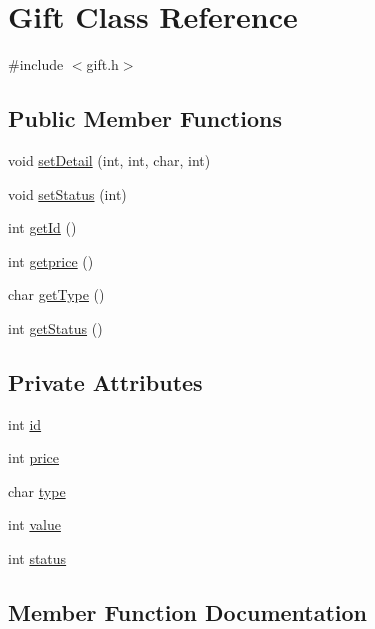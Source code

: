 \hypertarget{classGift}{}\section{Gift Class Reference}
\label{classGift}


{\ttfamily \#include $<$gift.\+h$>$}

\subsection*{Public Member Functions}
\begin{DoxyCompactItemize}
\item 
void \hyperlink{classGift_abc74fbed8b31b5bb7745b3e0c934da9e}{set\+Detail} (int, int, char, int)
\item 
void \hyperlink{classGift_a8c8a8be33c3abe17bbe4b8da9ac084d6}{set\+Status} (int)
\item 
int \hyperlink{classGift_a5b276dda8fab4a4e2618ba82fc8cd787}{get\+Id} ()
\item 
int \hyperlink{classGift_aa36f2b437e93ede1d2569e489b493441}{getprice} ()
\item 
char \hyperlink{classGift_aa7143116bd10c7e5635252d081b42ef9}{get\+Type} ()
\item 
int \hyperlink{classGift_ad0630b128cb1e8208d78ceaea24dee7a}{get\+Status} ()
\end{DoxyCompactItemize}
\subsection*{Private Attributes}
\begin{DoxyCompactItemize}
\item 
int \hyperlink{classGift_a145f971b2591cd6a363d4602c33d5d91}{id}
\item 
int \hyperlink{classGift_ad795362f286e8d5d73514fb64ac478b8}{price}
\item 
char \hyperlink{classGift_a9c99ffbeadb8f4974bddf5230c9a16b7}{type}
\item 
int \hyperlink{classGift_a71d14b92ebfd06993afe584f088bc748}{value}
\item 
int \hyperlink{classGift_a2f68e50f2675fc0a1c52f6c48c67882f}{status}
\end{DoxyCompactItemize}


\subsection{Member Function Documentation}
